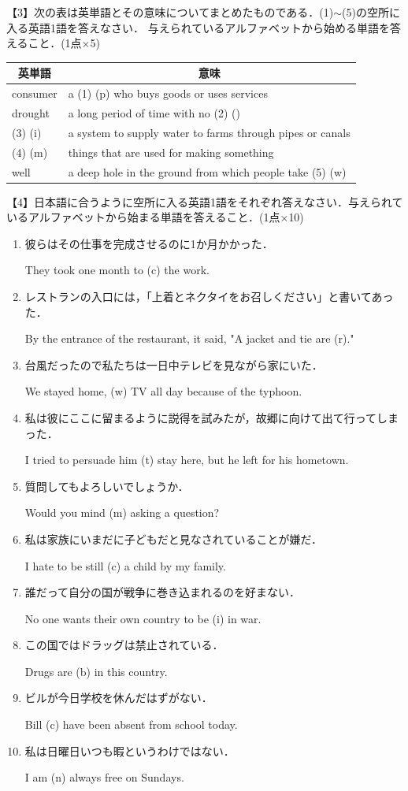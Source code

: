 \noindent 【3】次の表は英単語とその意味についてまとめたものである．(1)$\sim$(5)の空所に入る英語1語を答えなさい．
与えられているアルファベットから始める単語を答えること．(1点$\times$5)\bigskip\\
\begin{tabular}{|l|l|}
  \hline
  \multicolumn{1}{|c|}{英単語}&\multicolumn{1}{|c|}{意味} \\\hline
  consumer&a (1) (p\qquad) who buys goods or uses services \\\hline
  drought&a long period of time with no (2) (\qquad) \\\hline
  (3) (i\qquad)&a system to supply water to farms through pipes or canals \\\hline
  (4) (m\qquad)&things that are used for making something \\\hline
  well&a deep hole in the ground from which people take (5) (w\qquad) \\
  \hline
\end{tabular}
\bigskip\bigskip

\noindent 【4】日本語に合うように空所に入る英語1語をそれぞれ答えなさい．与えられているアルファベットから始まる単語を答えること．(1点$\times$10)
\begin{enumerate}
  \item 彼らはその仕事を完成させるのに1か月かかった．
  \par They took one month to (c\qquad) the work. 
  \item レストランの入口には，「上着とネクタイをお召しください」と書いてあった．
  \par By the entrance of the restaurant, it said, "A jacket and tie are (r\qquad)." 
  \item 台風だったので私たちは一日中テレビを見ながら家にいた．
  \par We stayed home, (w\qquad) TV all day because of the typhoon. 
  \item 私は彼にここに留まるように説得を試みたが，故郷に向けて出て行ってしまった．
  \par I tried to persuade him (t\qquad) stay here, but he left for his hometown. 
  \item 質問してもよろしいでしょうか．
  \par Would you mind (m\qquad) asking a question? 
  \item 私は家族にいまだに子どもだと見なされていることが嫌だ．
  \par I hate to be still (c\qquad) a child by my family.  
  \item 誰だって自分の国が戦争に巻き込まれるのを好まない．
  \par No one wants their own country to be (i\qquad) in war. 
  \item この国ではドラッグは禁止されている．
  \par Drugs are (b\qquad) in this country. 
  \item ビルが今日学校を休んだはずがない．
  \par Bill (c\qquad) have been absent from school today. 
  \item 私は日曜日いつも暇というわけではない．
  \par I am (n\qquad) always free on Sundays. 
\end{enumerate}
\bigskip\bigskip

